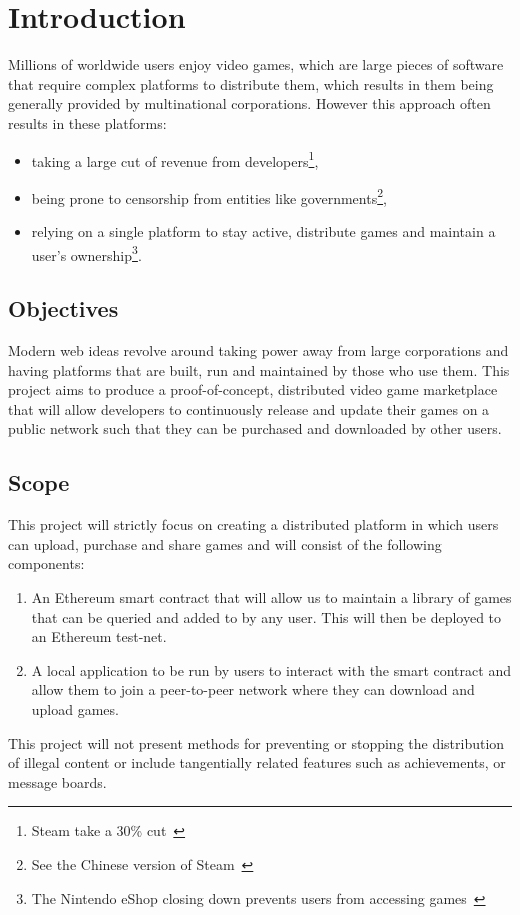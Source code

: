
\chapter{Introduction}\label{sec:problem}

Millions of worldwide users enjoy video games, which are large pieces of software that require complex platforms to distribute them, which results in them being generally provided by multinational corporations. However this approach often results in these platforms:

\begin{itemize}
  \item taking a large cut of revenue from developers\footnote{Steam take a 30\% cut~\cite{marks_report_2019,brown_valve_2021}},
  \item being prone to censorship from entities like governments\footnote{See the Chinese version of Steam~\cite{noauthor_steam_nodate-1}},
  \item relying on a single platform to stay active, distribute games and maintain a user's ownership\footnote{The Nintendo eShop closing down prevents users from accessing games~\cite{noauthor_nintendo_2022}}.
\end{itemize}

\section{Objectives}

Modern web ideas revolve around taking power away from large corporations and having platforms that are built, run and maintained by those who use them.
This project aims to produce a proof-of-concept, distributed video game marketplace that will allow developers to continuously release and update their games on a public network such that they can be purchased and downloaded by other users.

\section{Scope}

This project will strictly focus on creating a distributed platform in which users can upload, purchase and share games and will consist of the following components:

\begin{enumerate}
  \item An Ethereum smart contract that will allow us to maintain a library of games that can be queried and added to by any user. This will then be deployed to an Ethereum test-net.
  \item A local application to be run by users to interact with the smart contract and allow them to join a peer-to-peer network where they can download and upload games.
\end{enumerate}

\newparagraph
This project will not present methods for preventing or stopping the distribution of illegal content or include tangentially related features such as achievements, or message boards.
